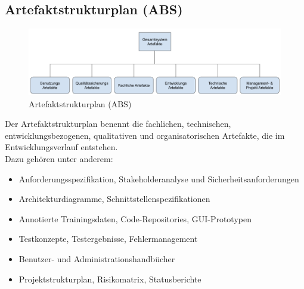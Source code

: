 \subsection{Artefaktstrukturplan (ABS)}
\begin{figure}[ht]
	\centering
	\includegraphics[width=1\textwidth]{fig/abs.png}
	\caption{Artefaktstrukturplan (ABS)}
	\label{fig:artefaktstrukturplan}
\end{figure}
Der Artefaktstrukturplan benennt die fachlichen, technischen, entwicklungsbezogenen, qualitativen und organisatorischen Artefakte, die im Entwicklungsverlauf entstehen. \\
Dazu gehören unter anderem:
\begin{itemize}
	\item Anforderungsspezifikation, Stakeholderanalyse und Sicherheitsanforderungen
	\item Architekturdiagramme, Schnittstellenspezifikationen
	\item Annotierte Trainingsdaten, Code-Repositories, GUI-Prototypen
	\item Testkonzepte, Testergebnisse, Fehlermanagement
	\item Benutzer- und Administrationshandbücher
	\item Projektstrukturplan, Risikomatrix, Statusberichte
\end{itemize}

